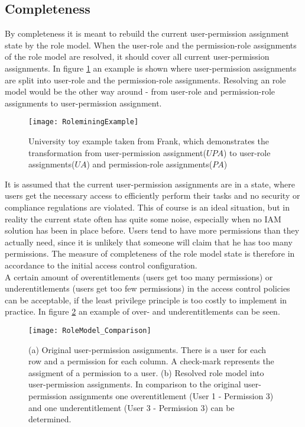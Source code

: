         \subsection{Completeness}
        By completeness it is meant to rebuild the current user-permission assignment state by the role model. When the user-role and the permission-role assignments of the role model are resolved, it should cover all current user-permission assignments. In figure \ref{fig:roleminingExample} an example is shown where user-permission assignments are split into user-role and the permission-role assignments. Resolving an role model would be the other way around - from user-role and permission-role assignments to user-permission assignment.
        \iffalse
        \hl{(FEEDBACK:different scenarios: 1. starting from scratch, 2. already have assignments)}
        \fi
        \begin{figure}[H]
            \centering
            \texttt{[image: RoleminingExample]}
            \caption{University toy example taken from Frank\cite{roleMiningExample}, which demonstrates the transformation from user-permission assignment($UPA$) to user-role assignments($UA$) and permission-role assignments($PA$)}
            \label{fig:roleminingExample}
        \end{figure}
        It is assumed that the current user-permission assignments are in a state, where users get the necessary access to efficiently perform their tasks and no security or compliance regulations are violated. This of course is an ideal situation, but in reality the current state often has quite some noise, especially when no IAM solution has been in place before. Users tend to have more permissions than they actually need, since it is unlikely that someone will claim that he has too many permissions. The measure of completeness of the role model state is therefore in accordance to the initial access control configuration.\\
        A certain amount of overentitlements (users get too many permissions) or underentitlements (users get too few permissions) in the access control policies can be acceptable, if the least privilege principle is too costly to implement in practice. In figure \ref{fig:rolemodelComparison} an example of over- and underentitlements can be seen.
        \begin{figure}[H]
            \centering
            \texttt{[image: RoleModel\_Comparison]}
            \caption{(a) Original user-permission assignments. There is a user for each row and a permission for each column. A check-mark represents the assigment of a permission to a user. (b) Resolved role model into user-permission assignments. In comparison to the original user-permission assignments one overentitlement (User 1 - Permission 3) and one underentitlement (User 3 - Permission 3) can be determined.}
            \label{fig:rolemodelComparison}
        \end{figure}
